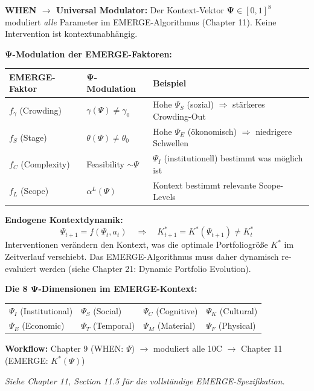 \begin{tcolorbox}[
    colback=blue!5!white,
    colframe=blue!75!black,
    title={\textbf{Cross-Reference: EMERGE Algorithm (Chapter 11, EIT-EMP)}},
    fonttitle=\bfseries
]
\textbf{WHEN $\rightarrow$ Universal Modulator:} Der Kontext-Vektor $\boldsymbol{\Psi} \in [0,1]^8$ moduliert \emph{alle} Parameter im EMERGE-Algorithmus (Chapter 11). Keine Intervention ist kontextunabhängig.

\medskip
\textbf{Ψ-Modulation der EMERGE-Faktoren:}
\begin{center}
\begin{tabular}{lll}
\textbf{EMERGE-Faktor} & \textbf{Ψ-Modulation} & \textbf{Beispiel} \\
\midrule
$f_\gamma$ (Crowding) & $\gamma(\Psi) \neq \gamma_0$ & Hohe $\Psi_S$ (sozial) $\Rightarrow$ stärkeres Crowding-Out \\
$f_S$ (Stage) & $\theta(\Psi) \neq \theta_0$ & Hohe $\Psi_E$ (ökonomisch) $\Rightarrow$ niedrigere Schwellen \\
$f_C$ (Complexity) & Feasibility $\sim \Psi$ & $\Psi_I$ (institutionell) bestimmt was möglich ist \\
$f_L$ (Scope) & $\alpha^L(\Psi)$ & Kontext bestimmt relevante Scope-Levels \\
\end{tabular}
\end{center}

\medskip
\textbf{Endogene Kontextdynamik:}
\[
\Psi_{t+1} = f(\Psi_t, a_t) \quad \Rightarrow \quad K^*_{t+1} = K^*(\Psi_{t+1}) \neq K^*_t
\]
Interventionen verändern den Kontext, was die optimale Portfoliogröße $K^*$ im Zeitverlauf verschiebt. Das EMERGE-Algorithmus muss daher dynamisch re-evaluiert werden (siehe Chapter 21: Dynamic Portfolio Evolution).

\medskip
\textbf{Die 8 Ψ-Dimensionen im EMERGE-Kontext:}
\begin{center}
\small
\begin{tabular}{llll}
$\Psi_I$ (Institutional) & $\Psi_S$ (Social) & $\Psi_C$ (Cognitive) & $\Psi_K$ (Cultural) \\
$\Psi_E$ (Economic) & $\Psi_T$ (Temporal) & $\Psi_M$ (Material) & $\Psi_F$ (Physical)
\end{tabular}
\end{center}

\medskip
\textbf{Workflow:} Chapter 9 (WHEN: $\Psi$) $\rightarrow$ moduliert alle 10C $\rightarrow$ Chapter 11 (EMERGE: $K^*(\Psi)$)

\medskip
\textit{Siehe Chapter 11, Section 11.5 für die vollständige EMERGE-Spezifikation.}
\end{tcolorbox}


